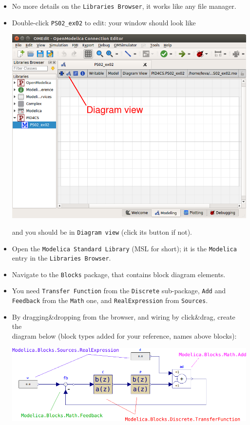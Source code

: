 \begin{frame}
\myPause
 \begin{itemize}[<+-| alert@+>]
 \item No more details on the \texttt{Libraries Browser}, it works like any file manager.
 \item Double-click \texttt{PS02\_ex02} to edit: your window should look like
       \begin{center}
        \includegraphics[width=0.40\columnwidth]{./Unit-05/img/PS02-ex02-fig01.png}
       \end{center}
       and you should be in \texttt{Diagram view} (click its button if not).
 \end{itemize}
\end{frame}

\begin{frame}
\myPause
 \begin{itemize}[<+-| alert@+>]
 \item Open the \texttt{Modelica Standard Library} (MSL for short); it is the \texttt{Modelica}
       entry in the \texttt{Libraries Browser}.
 \item Navigate to the \texttt{Blocks} package, that contains block diagram elements.
 \item You need \texttt{Transfer Function} from the \texttt{Discrete} sub-package, \texttt{Add}
       and \texttt{Feedback} from the \texttt{Math} one, and \texttt{RealExpression} from \texttt{Sources}.
 \item By dragging{\&}dropping from the browser, and wiring by click{\&}drag, create the\\
       diagram below (block types added for your reference, names above blocks):
       \begin{center}
        \includegraphics[width=0.60\columnwidth]{./Unit-05/img/PS02-ex02-fig02.png}
       \end{center}
 \end{itemize}
\end{frame}


